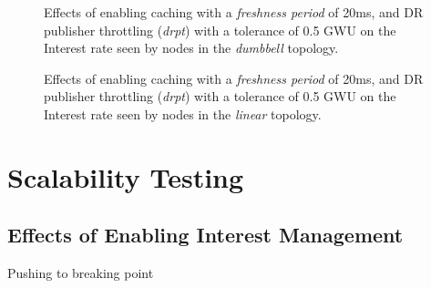 \begin{figure}[H]
    \centering
    \caption{Effects of enabling caching with a \textit{freshness period} of 20ms, and DR publisher throttling (\textit{drpt}) with a tolerance of 0.5 GWU on the Interest rate seen by nodes in the \textit{dumbbell} topology.}
    \label{fig:eval:dr-pub-throt:dumbbell-interest-rates}
\end{figure}

\begin{figure}[H]
    \centering
    \caption{Effects of enabling caching with a \textit{freshness period} of 20ms, and DR publisher throttling (\textit{drpt}) with a tolerance of 0.5 GWU on the Interest rate seen by nodes in the \textit{linear} topology.}
    \label{fig:eval:dr-pub-throt:linear-interest-rates}
\end{figure}



\section{Scalability Testing}\label{sec:eval:scalability}

\subsection{Effects of Enabling Interest Management}
Pushing to breaking point